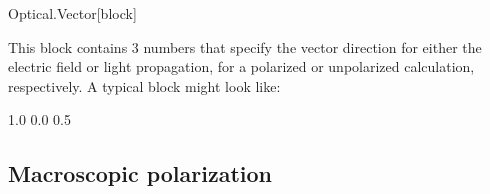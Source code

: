 \begin{fdfentry}{Optical.Vector}[block]
  
  This block contains 3 numbers that specify the vector direction for
  either the electric field or light propagation, for a polarized or
  unpolarized calculation, respectively. A typical block might look
  like:
  \begin{fdfexample}
        1.0 0.0 0.5
  \end{fdfexample}

\end{fdfentry}




\subsection{Macroscopic polarization}


